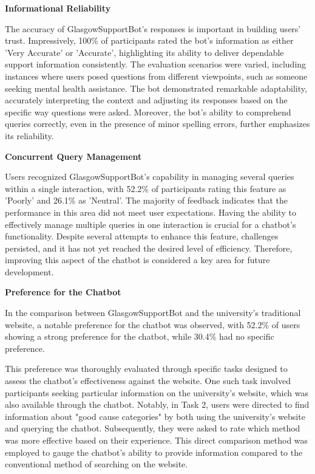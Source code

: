 \documentclass{l4proj}
\begin{document}
\textbf{Informational Reliability}

The accuracy of GlasgowSupportBot's responses is important in building users' trust. Impressively, 100\% of participants rated the bot's information as either 'Very Accurate' or 'Accurate', highlighting its ability to deliver dependable support information consistently. The evaluation scenarios were varied, including instances where users posed questions from different viewpoints, such as someone seeking mental health assistance. The bot demonstrated remarkable adaptability, accurately interpreting the context and adjusting its responses based on the specific way questions were asked. Moreover, the bot's ability to comprehend queries correctly, even in the presence of minor spelling errors, further emphasizes its reliability. 

\textbf{Concurrent Query Management}

Users recognized GlasgowSupportBot's capability in managing several queries within a single interaction, with 52.2\% of participants rating this feature as 'Poorly' and 26.1\% as 'Neutral'. The majority of feedback indicates that the performance in this area did not meet user expectations. Having the ability to effectively manage multiple queries in one interaction is crucial for a chatbot's functionality. Despite several attempts to enhance this feature, challenges persisted, and it has not yet reached the desired level of efficiency. Therefore, improving this aspect of the chatbot is considered a key area for future development.

\textbf{Preference for the Chatbot}

In the comparison between GlasgowSupportBot and the university's traditional website, a notable preference for the chatbot was observed, with 52.2\% of users showing a strong preference for the chatbot, while 30.4\% had no specific preference.

This preference was thoroughly evaluated through specific tasks designed to assess the chatbot's effectiveness against the website. One such task involved participants seeking particular information on the university's website, which was also available through the chatbot. Notably, in Task 2, users were directed to find information about "good cause categories" by both using the university's website and querying the chatbot. Subsequently, they were asked to rate which method was more effective based on their experience. This direct comparison method was employed to gauge the chatbot's ability to provide information compared to the conventional method of searching on the website.
\end{document}
